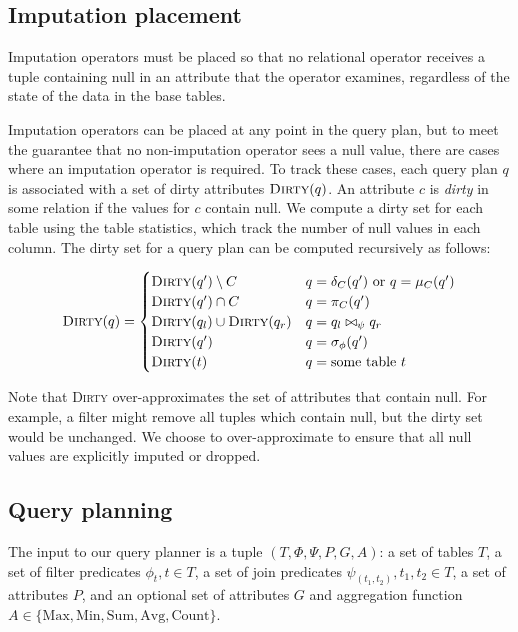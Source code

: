 \subsection{Imputation placement}
\label{sec:placement}
Imputation operators must be placed so that no relational operator receives a tuple containing null in an attribute that the operator examines, regardless of the state of the data in the base tables.

Imputation operators can be placed at any point in the query plan, but to meet the guarantee that no non-imputation operator sees a null value, there are cases where an imputation operator is required. To track these cases, each query plan $q$ is associated with a set of dirty attributes $\textsc{Dirty}(q)$. An attribute $c$ is \emph{dirty} in some relation if the values for $c$ contain null. We compute a dirty set for each table using the table statistics, which track the number of null values in each column. The dirty set for a query plan can be computed recursively as follows:

\begin{align*}
  \textsc{Dirty}(q) = \begin{cases}
    \textsc{Dirty}(q') \setminus C & q = \delta_C(q')\ \text{or}\ q = \mu_C(q') \\
    \textsc{Dirty}(q') \cap C & q = \pi_C(q') \\
    \textsc{Dirty}(q_l) \cup \textsc{Dirty}(q_r) & q = q_l \bowtie_\psi q_r \\
    \textsc{Dirty}(q') & q = \sigma_\phi(q') \\
    \textsc{Dirty}(t) & q = \text{some table}\ t \\
  \end{cases}
\end{align*}

Note that \textsc{Dirty} over-approximates the set of attributes that contain null. For example, a filter might remove all tuples which contain null, but the dirty set would be unchanged. We choose to over-approximate to ensure that all null values are explicitly imputed or dropped.

\subsection{Query planning}
The input to our query planner is a tuple $(T, \Phi, \Psi, P, G, A)$: a set of tables $T$, a set of filter predicates $\phi_t, t \in T$, a set of join predicates $\psi_{(t_1, t_2)}, t_1, t_2 \in T$, a set of attributes $P$, and an optional set of attributes $G$ and aggregation function $A \in \{\text{Max}, \text{Min}, \text{Sum}, \text{Avg}, \text{Count}\}$.

